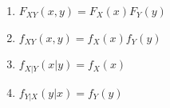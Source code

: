 \begin{multicols}{2}
\begin{enumerate}[resume*=calcrulesrv]
    \item $F _{X Y} (x, y) = F_X (x) F_Y (y)$
    \hfill \cite{statistics/book/Statistics-for-Data-Scientists/Maurits-Kaptein}

    \item $f _{X Y} (x, y) = f_X (x) f_Y (y)$
    \hfill \cite{statistics/book/Statistics-for-Data-Scientists/Maurits-Kaptein}

    \item $f _{X|Y} (x|y) = f_X (x)$
    \hfill \cite{statistics/book/Statistics-for-Data-Scientists/Maurits-Kaptein}

    \item $f _{Y|X} (y|x) = f_Y (y)$
    \hfill \cite{statistics/book/Statistics-for-Data-Scientists/Maurits-Kaptein}
\end{enumerate}
\end{multicols}



































